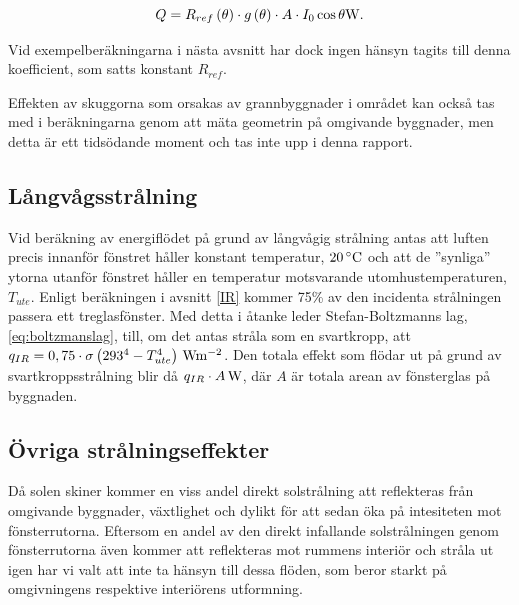 \begin{equation}\label{eq:totalsunblinds}
Q = R_{ref}\left( \theta \right) \cdot g\left( \theta \right) \cdot A \cdot I_0 \cos{\theta} \unit[]{W}.
\end{equation}

Vid exempelberäkningarna i nästa avsnitt har dock ingen hänsyn tagits till denna koefficient, som satts konstant $R_{ref}$.

Effekten av skuggorna som orsakas av grannbyggnader i området kan också tas med i beräkningarna genom att mäta geometrin på omgivande byggnader, men detta är ett tidsödande moment och tas inte upp i denna rapport.

\subsection{Långvågsstrålning}\label{subsec:IRmethod}

Vid beräkning av energiflödet på grund av långvågig strålning antas att luften precis innanför fönstret håller konstant temperatur, $\unit[20]{^{\circ}C}$ och att de ''synliga'' ytorna utanför fönstret håller en temperatur motsvarande utomhustemperaturen, $T_{ute}$. Enligt beräkningen i avsnitt \ref{IR} kommer 75\% av den incidenta strålningen passera ett treglasfönster. Med detta i åtanke leder Stefan-Boltzmanns lag, \eqref{eq:boltzmanslag}, till, om det antas stråla som en svartkropp, att $q_{IR} = 0,75 \cdot \sigma \unit[\left( 293^4 - T_{ute}^4\right)]{Wm^{-2}}$. Den totala effekt som flödar ut på grund av svartkroppsstrålning blir då $\unit[q_{IR}\cdot A]{W}$, där $A$ är totala arean av fönsterglas på byggnaden.

\subsection{Övriga strålningseffekter}\label{subsec:otherradiation}

Då solen skiner kommer en viss andel direkt solstrålning att reflekteras från omgivande byggnader, växtlighet och dylikt för att sedan öka på intesiteten mot fönsterrutorna. Eftersom en andel av den direkt infallande solstrålningen genom fönsterrutorna även kommer att reflekteras mot rummens interiör och stråla ut igen har vi valt att inte ta hänsyn till dessa flöden, som beror starkt på omgivningens respektive interiörens utformning.

